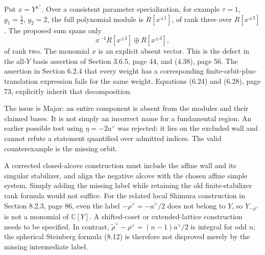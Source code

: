 \documentclass[10pt]{article}
\begin{document}
Put \(x=Y^{a^\vee}\). Over a consistent parameter specialization, for example \(\tau=1\), \(g_1=\tfrac12\), \(g_2=2\), the full polynomial module is \(R[x^{\pm1}]\), of rank three over \(R[x^{\pm3}]\). The proposed sum spans only \[x^{-1}R[x^{\pm3}]\oplus R[x^{\pm3}],\] of rank two. The monomial \(x\) is an explicit absent vector. This is the defect in the all-\(Y\) basis assertion of Section 3.6.5, page 44, and (4.38), page 56. The assertion in Section 6.2.4 that every weight has a corresponding finite-orbit-plus-translation expression fails for the same weight. Equations (6.24) and (6.28), page 73, explicitly inherit that decomposition.\par
The issue is Major: an entire component is absent from the modules and their claimed bases. It is not simply an incorrect name for a fundamental region. An earlier possible test using \(\eta=-2a^\vee\) was rejected: it lies on the excluded wall and cannot refute a statement quantified over admitted indices. The valid counterexample is the missing orbit.\par
A corrected closed-alcove construction must include the affine wall and its singular stabilizer, and align the negative alcove with the chosen affine simple system. Simply adding the missing label while retaining the old finite-stabilizer rank formula would not suffice. For the related local Shimura construction in Section 8.2.3, page 86, even the label \(-\rho^\vee=-a^\vee/2\) does not belong to \(Y\), so \(Y_{-\rho^\vee}\) is not a monomial of \(\mathbb C[Y]\). A shifted-coset or extended-lattice construction needs to be specified. In contrast, \(\widetilde\rho^\vee-\rho^\vee=(n-1)a^\vee/2\) is integral for odd \(n\); the spherical Steinberg formula (8.12) is therefore not disproved merely by the missing intermediate label.\par
\end{document}
